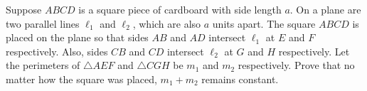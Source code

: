 Suppose $ABCD$ is a square piece of cardboard with side length $a$. On a plane are two parallel lines $\ell_1$ and $\ell_2$, which are also $a$ units apart. The square $ABCD$ is placed on the plane so that sides $AB$ and $AD$ intersect $\ell_1$ at $E$ and $F$ respectively. Also, sides $CB$ and $CD$ intersect $\ell_2$ at $G$ and $H$ respectively. Let the perimeters of $\triangle AEF$ and $\triangle CGH$ be $m_1$ and $m_2$ respectively. Prove that no matter how the square was placed, $m_1+m_2$ remains constant.
